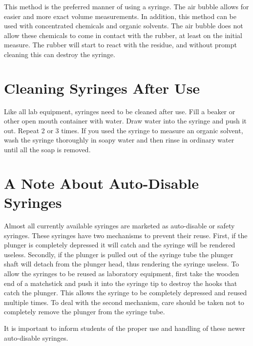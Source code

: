 This method is the preferred manner of using a syringe. The air bubble allows for easier and more exact volume measurements. In addition, this method can be used with concentrated chemicals and organic solvents. The air bubble does not allow these chemicals to come in contact with the rubber, at least on the initial measure. The rubber will start to react with the residue, and without prompt cleaning this can destroy the syringe.
 
\section{Cleaning Syringes After Use}

Like all lab equipment, syringes need to be cleaned after use. Fill a beaker or other open mouth container with water. Draw water into the syringe and push it out. Repeat 2 or 3 times. If you used the syringe to measure an organic solvent, wash the syringe thoroughly in soapy water and then rinse in ordinary water until all the soap is removed.

\section{A Note About Auto-Disable Syringes}

Almost all currently available syringes are marketed as auto-disable or safety syringes. These syringes have two mechanisms to prevent their reuse. First, if the plunger is completely depressed it will catch and the syringe will be rendered useless. Secondly, if the plunger is pulled out of the syringe tube the plunger shaft will detach from the plunger head, thus rendering the syringe useless. To allow the syringes to be reused as laboratory equipment, first take the wooden end of a matchstick and push it into the syringe tip to destroy the hooks that catch the plunger. This allows the syringe to be completely depressed and reused multiple times. To deal with the second mechanism, care should be taken not to completely remove the plunger from the syringe tube.

It is important to inform students of the proper use and handling of these newer auto-disable syringes.    